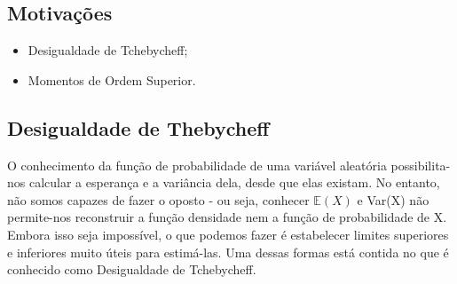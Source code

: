 \documentclass{article}
\begin{document}
\subsection{Motivações}
\begin{itemize}
  \item Desigualdade de Tchebycheff;
  \item Momentos de Ordem Superior.
\end{itemize}
\subsection{Desigualdade de Thebycheff}
O conhecimento da função de probabilidade de uma variável aleatória possibilita-nos calcular a esperança e a variância
dela, desde que elas existam. No entanto, não somos capazes de fazer o oposto - ou seja, conhecer \(\mathbb{E}(X)\)
e Var(X) não permite-nos reconstruir a função densidade nem a função de probabilidade de X.
Embora isso seja impossível, o que podemos fazer é estabelecer limites superiores e inferiores muito úteis para estimá-las.
Uma dessas formas está contida no que é conhecido como Desigualdade de Tchebycheff.
\end{document}
